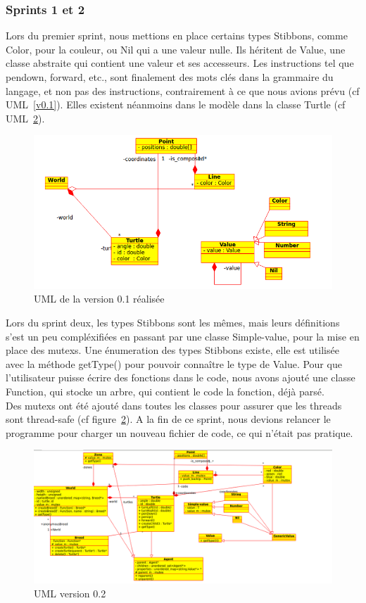 \subsubsection{Sprints 1 et 2}
Lors du premier sprint, nous mettions en place certains types Stibbons, comme Color, pour la couleur, ou Nil qui a une valeur nulle. Ils héritent de Value, une classe abstraite qui contient une valeur et ses accesseurs.
Les instructions tel que pendown, forward, etc., sont finalement des mots clés dans la grammaire du langage, et non pas des instructions, contrairement à ce que nous avions prévu (cf UML~\ref{v0.1}).
Elles existent néanmoins dans le modèle dans la classe Turtle (cf UML~\ref{v0.2}).

\begin{figure}[h]
\includegraphics[scale=0.5]{doc/report/uml/v01reel.png}
\caption{\label{v0.1R} UML de la version 0.1 réalisée}
\end{figure}

Lors du sprint deux, les types Stibbons sont les mêmes, mais leurs définitions s'est un peu compléxifiées en passant par une classe Simple-value, pour la mise en place des mutexs. Une énumeration des types Stibbons existe, elle est utilisée avec la méthode getType() pour pouvoir connaître le type de Value.
Pour que l'utilisateur puisse écrire des fonctions dans le code, nous avons ajouté une classe Function, qui stocke un arbre, qui contient le code la fonction, déjà parsé.
\\ Des mutexs ont été ajouté dans toutes les classes pour assurer que les threads sont thread-safe (cf figure~\ref{v0.2}).
A la fin de ce sprint, nous devions relancer le programme pour charger un nouveau fichier de code, ce qui n'était pas pratique.
\begin{figure}[h]
\includegraphics[scale=0.45]{doc/report/uml/v02.png}
\caption{\label{v0.2} UML version 0.2}
\end{figure}
